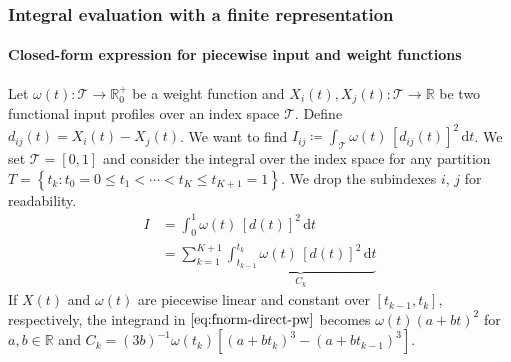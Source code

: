 \documentclass{snedecorbeamer}
\begin{document}
\begin{frame}%
  \label{frm:integral-pcws}
  \frametitle{Integral evaluation with a finite representation}
  \framesubtitle{Closed-form expression for piecewise input and weight functions}

  \newcommand{\calT}{\mathcal{T}}
  \newcommand{\dt}{\, \mathrm{d}t}
  \newcommand{\du}{\, \mathrm{d}u}
  \newcommand{\dv}{\, \mathrm{d}v}
  \newcommand{\w}{\omega}
  \newcommand{\dotsq}{{\left[d(t)\right]}^2}
  \newcommand{\fall}{\,~\forall~\,}

  Let $\w(t): \calT \to \mathbb{R}_0^+$ be a weight function and $X_i(t),
  X_j(t): \calT \to \mathbb{R}$ be two functional input profiles over an index
  space $\calT$. Define $d_{ij}(t) = X_i(t) - X_j(t)$. We want to find $ I_{ij}
  \coloneqq \int_{\calT} \w(t) \, {\left[d_{ij}(t)\right]}^2 \dt$. We set
  $\calT = [0, 1]$ and consider the integral over the index space for any
  partition $T = \left\{ t_k: t_0 = 0 \le t_1 < \cdots < t_K \le t_{K+1} = 1
  \right\}$. We drop the subindexes $i$, $j$ for readability.
  \begin{align}
  I
  &=\int_0^1 \w(t) \, \dotsq \dt \label{eq:fnorm-direct} \\
  &=\sum_{k = 1}^{K + 1}
    \underbrace{
    \int_{t_{k-1}}^{t_k} \w(t) \, \dotsq
    \dt}_{C_k} \label{eq:fnorm-direct-pw}
  \end{align}
  If $X(t)$ and $\omega(t)$ are piecewise linear and constant over $[t_{k-1},
  t_{k}]$, respectively, the integrand in $\cref{eq:fnorm-direct-pw}$ becomes
  $\omega(t) {(a + bt)}^2$ for $a,b\in\mathbb{R}$ and $C_k =
  {(3b)}^{-1}\omega(t_k)
  \left[
    {(a + b t_k)}^3 -
    {(a + b t_{k-1})}^3
  \right]
  $.
\end{frame}
\end{document}
